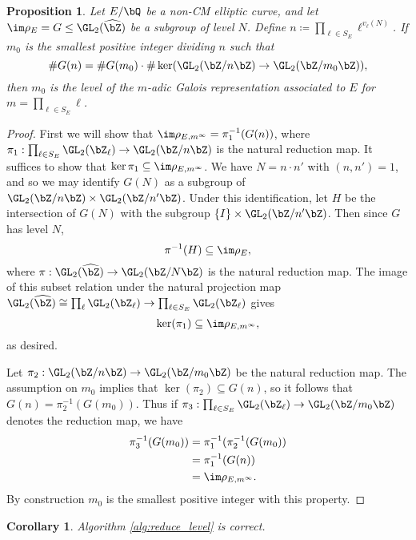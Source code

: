 \documentclass[11pt,reqno]{amsart}
\theoremstyle{plain}
\newtheorem{proposition}[theorem]{Proposition}
\newtheorem{corollary}[theorem]{Corollary}
\theoremstyle{definition}
\newcommand{\Q}{\bQ}
\newcommand{\Z}{\bZ}
\begin{document}
  \begin{proposition}
  Let $E/\Q$ be a non-CM elliptic curve, and let $\im \rho_E=G \leq \GL_2(\widehat{\Z})$ be a subgroup of level $N$. Define $n \coloneqq \prod_{\ell \in S_E} \ell^{v_{\ell}(N)}$. If $m_0$ is the smallest positive integer dividing $n$ such that \[\#G(n)=\#G(m_0) \cdot \#\ker(\GL_2(\Z/n\Z) \rightarrow \GL_2(\Z/m_0\Z)),\] then $m_0$ is the level of the $m$-adic Galois representation associated to $E$ for $m= \prod_{\ell \in S_E} \ell$.
  \end{proposition}
  \begin{proof}
  First we will show that $\im \rho_{E,m^{\infty}}=\pi_1^{-1}(G(n))$, where $\pi_1:\prod_{\ell \in S_E} \GL_2(\Z_{\ell}) \rightarrow \GL_2(\Z/n\Z)$ is the natural reduction map. It suffices to show that $\ker \pi_1 \subseteq \im \rho_{E,m^{\infty}}$. We have $N=n\cdot n'$ with $(n,n')=1$, and so we may identify $G(N)$ as a subgroup of $\GL_2(\Z/n\Z) \times \GL_2(\Z/n'\Z)$. Under this identification, let $H$  be the intersection of $G(N)$ with the subgroup $\{I\} \times \GL_2(\Z/n'\Z)$. Then since $G$ has level $N$,
  \[
  \pi^{-1}(H) \subseteq \im \rho_E,
  \]
  where $\pi: \GL_2(\widehat{\Z}) \rightarrow \GL_2(\Z/N\Z)$ is the natural reduction map. The image of this subset relation under the natural projection map  $\GL_2(\widehat{\Z}) \cong \prod_{\ell} \GL_2(\Z_{\ell}) \rightarrow  \prod_{\ell \in S_E} \GL_2(\Z_{\ell}) $ gives
  \[
  \ker(\pi_1) \subseteq \im \rho_{E,m^{\infty}},
  \]
  as desired.
  
Let $\pi_2: \GL_2(\Z/n\Z) \rightarrow \GL_2(\Z/m_0\Z)$ be the natural reduction map. The assumption on $m_0$ implies that $\ker(\pi_2) \subseteq G(n)$, so it follows that $G(n) = \pi_2^{-1}(G(m_0))$. Thus if $\pi_3: \prod_{\ell \in S_E} \GL_2(\Z_{\ell}) \rightarrow \GL_2(\Z/m_0\Z)$ denotes the reduction map, we have
  \begin{align*}
  \pi_3^{-1}(G(m_0))&=\pi_1^{-1}(\pi_2^{-1}(G(m_0))\\
  &=\pi_1^{-1}(G(n))\\
  &=\im \rho_{E,m^{\infty}}.
  \end{align*}
By construction $m_0$ is the smallest positive integer with this property.
  \end{proof}
  
  \begin{corollary}
  Algorithm \ref{alg:reduce_level} is correct.
  \end{corollary}
  
\end{document}
